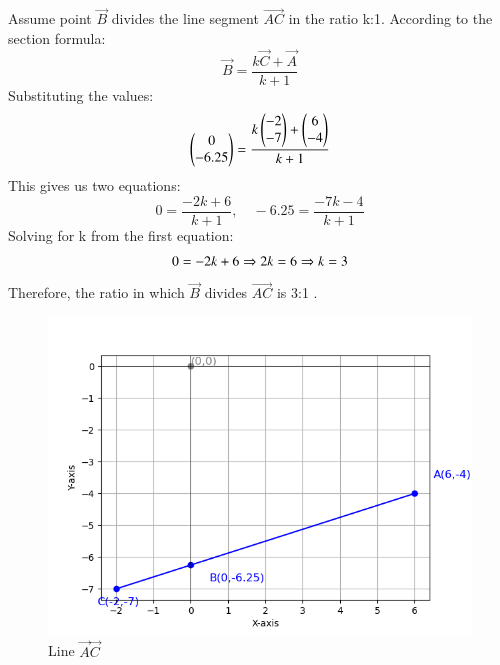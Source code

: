 \documentclass[journal]{IEEEtran}
\numberwithin{equation}{enumi}
\numberwithin{figure}{enumi}
\begin{document}
Assume point $\vec{B}$ divides the line segment $\vec{AC}$ in the ratio  k:1.  According to the section formula:
\begin{equation}
\vec{B} = \frac{k\vec{C}+\vec{A}}{k+1}
\end{equation}
Substituting the values:
\begin{equation}
\begin{pmatrix}0 \\ -6.25\end{pmatrix}  = \frac{k \begin{pmatrix}-2 \\ -7\end{pmatrix} +  \begin{pmatrix}6 \\ -4\end{pmatrix} }{k+1}
\end{equation}
This gives us two equations:
\begin{equation}
0 = \frac{-2k + 6}{k+1}, \quad -6.25 = \frac{-7k - 4}{k+1}
\end{equation}
Solving for k from the first equation:
\begin{equation}
0 = -2k + 6 \\
\Rightarrow  2k = 6 \\
\Rightarrow k = 3 \\
\end{equation}
Therefore, the ratio in which  $\vec{B}$  divides $\vec{AC}$ is  3:1 .
\begin{figure}[h!]
	\centering
	\includegraphics[width=0.5\linewidth]{Figure_1.png}
	\caption{ Line $\vec{A}\vec{C}$}
	\label{stemplot}
\end{figure}	
\end{document}
